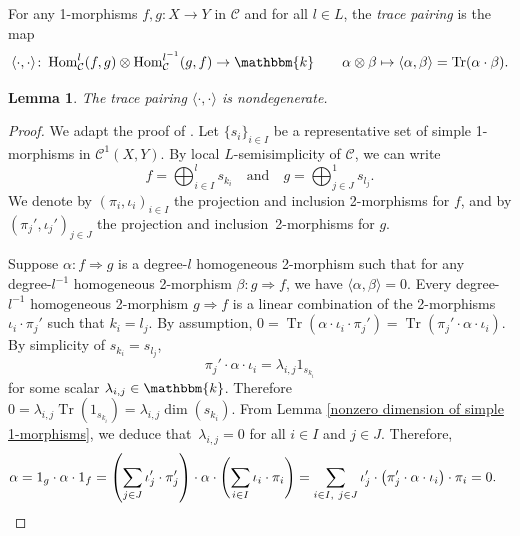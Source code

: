 \documentclass[a4paper, oneside]{amsart}
\numberwithin{equation}{subsection}
\theoremstyle{referencedlemma}
\theoremstyle{plain} %
\newtheorem{lem}[equation]{Lemma}
\theoremstyle{remark}
\begin{document}
For any 1-morphisms $f, g\colon X\to Y$ in $\mathcal{C}$ and for all $l\in L$,  the \emph{trace pairing} is the map
$$
\langle \cdot, \cdot\rangle \colon \operatorname{Hom}_\mathcal{C}^l(f,g) \otimes \operatorname{Hom}_\mathcal{C}^{l^{-1}}(g,f) \to \mathbbm{k} \quad \quad \alpha\otimes \beta \mapsto \langle \alpha, \beta\rangle = \mathrm{Tr}(\alpha\cdot \beta).
$$

\begin{lem}\label{The trace pairing is nondegenerate}
The trace pairing $\langle \cdot, \cdot \rangle$ is nondegenerate.
\end{lem}

\begin{proof}
We adapt the proof of \cite[Proposition 2.3.14]{douglas_fusion_2018}. Let $\{s_i\}_{i\in I}$ be a representative set of simple 1-morphisms in $\mathcal{C}^1(X,Y)$.  By local $L$-semisimplicity of $\mathcal{C}$,  we can write
$$
f = \bigoplus^l_{i\in I}s_{k_i} \quad \text{and} \quad g = \bigoplus^1_{j\in J} s_{l_j}.
$$
We denote by $(\pi_i, \iota_i)_{i\in I}$ the projection and inclusion 2-morphisms for $f$, and by $(\pi_j', \iota_j')_{j\in J}$ the projection and inclusion~2-morphisms for $g$.  

Suppose $\alpha \colon f \Rightarrow g$ is a degree-$l$ homogeneous 2-morphism such that for any degree-$l^{-1}$ homogeneous 2-morphism $\beta \colon g \Rightarrow f$, we have $\langle \alpha, \beta\rangle = 0$.  Every degree-$l^{-1}$ homogeneous 2-morphism $g\Rightarrow f$ is a linear combination of the 2-morphisms $\iota_i \cdot \pi_j'$ such that $k_i = l_j$.  By assumption, $0  = \operatorname{Tr}(\alpha \cdot \iota_i \cdot \pi_j') = \operatorname{Tr}(\pi_j' \cdot \alpha \cdot \iota_i)$. By simplicity of $s_{k_i} = s_{l_j}$,  $$ \pi_j' \cdot \alpha \cdot \iota_i = \lambda_{i,j}1_{s_{k_i}}$$ for some scalar $\lambda_{i,j} \in \mathbbm{k}$. Therefore $0 = \lambda_{i,j}\operatorname{Tr}(1_{s_{k_i}}) = \lambda_{i,j}\operatorname{dim}(s_{k_i})$.  From Lemma \ref{nonzero dimension of simple 1-morphisms}, we deduce that~$\lambda_{i,j} = 0$ for all $i\in I$ and $j\in J$.  Therefore,
\begin{align*}
\alpha &= 1_g \cdot \alpha \cdot 1_f
= \left(\sum_{j\in J}\iota_j' \cdot \pi_j'\right) \cdot \alpha \cdot \left(\sum_{i\in I} \iota_i \cdot \pi_i\right)
= \sum_{i\in I, \ j \in J}\iota_j' \cdot \left( \pi_j'\cdot \alpha \cdot \iota_i \right) \cdot \pi_i
= 0.\qedhere
\end{align*}
\end{proof}
\end{document}
